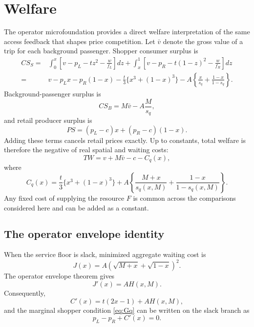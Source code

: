 \section{Welfare}\label{sec:welfare}

The operator microfoundation provides a direct welfare interpretation of the same access feedback that shapes price competition. Let $\bar v$ denote the gross value of a trip for each background passenger. Shopper consumer surplus is
\begin{align}
CS_S
={}&\int_0^x\left[v-p_L-tz^2-\frac{w}{f_L}\right]dz
+\int_x^1\left[v-p_R-t(1-z)^2-\frac{w}{f_R}\right]dz\\
={}&v-p_Lx-p_R(1-x)
-\frac{t}{3}\{x^3+(1-x)^3\}
-A\left\{\frac{x}{s_q}+\frac{1-x}{1-s_q}\right\}.
\label{eq:shopper_cs}
\end{align}
Background-passenger surplus is
\begin{equation}
CS_B=M\bar v-A\frac{M}{s_q},
\end{equation}
and retail producer surplus is
\begin{equation}
PS=(p_L-c)x+(p_R-c)(1-x).
\end{equation}
Adding these terms cancels retail prices exactly. Up to constants, total welfare is therefore the negative of real spatial and waiting costs:
\begin{equation}
TW=v+M\bar v-c-C_q(x),
\label{eq:TW}
\end{equation}
where
\begin{equation}
C_q(x)=
\frac{t}{3}\{x^3+(1-x)^3\}
+A\left\{\frac{M+x}{s_q(x,M)}+\frac{1-x}{1-s_q(x,M)}\right\}.
\label{eq:real_cost}
\end{equation}
Any fixed cost of supplying the resource $F$ is common across the comparisons considered here and can be added as a constant.

\subsection{The operator envelope identity}

When the service floor is slack, minimized aggregate waiting cost is
\begin{equation}
J(x)=A\left(\sqrt{M+x}+\sqrt{1-x}\right)^2.
\label{eq:J}
\end{equation}
The operator envelope theorem gives
\begin{equation}
J'(x)=A H(x,M).
\label{eq:envelope}
\end{equation}
Consequently,
\begin{equation}
C'(x)=t(2x-1)+AH(x,M),
\label{eq:Cprime}
\end{equation}
and the marginal shopper condition \eqref{eq:Gq} can be written on the slack branch as
\begin{equation}
p_L-p_R+C'(x)=0.
\label{eq:demand_welfare_identity}
\end{equation}

